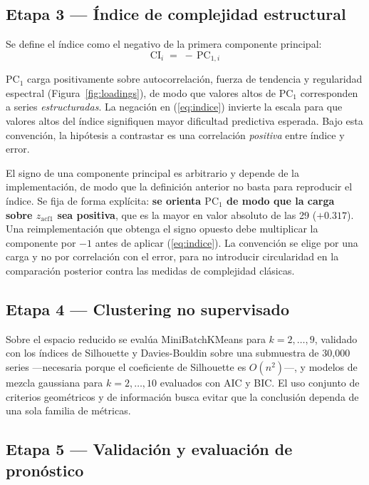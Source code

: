 \subsection{Etapa 3 --- Índice de complejidad estructural}

Se define el índice como el negativo de la primera componente principal:
\begin{equation}
\mathrm{CI}_i \;=\; -\,\mathrm{PC}_{1,i}
\label{eq:indice}
\end{equation}

$\mathrm{PC}_1$ carga positivamente sobre autocorrelación, fuerza de tendencia y
regularidad espectral (Figura~\ref{fig:loadings}), de modo que valores altos de
$\mathrm{PC}_1$ corresponden a series \emph{estructuradas}. La negación en
(\ref{eq:indice}) invierte la escala para que valores altos del índice signifiquen
mayor dificultad predictiva esperada. Bajo esta convención, la hipótesis a
contrastar es una correlación \emph{positiva} entre índice y error.

El signo de una componente principal es arbitrario y depende de la implementación, de
modo que la definición anterior no basta para reproducir el índice. Se fija de forma
explícita: \textbf{se orienta $\mathrm{PC}_1$ de modo que la carga sobre
$z_{\mathrm{acf1}}$ sea positiva}, que es la mayor en valor absoluto de las 29
($+0.317$). Una reimplementación que obtenga el signo opuesto debe multiplicar la
componente por $-1$ antes de aplicar (\ref{eq:indice}). La convención se elige por una
carga y no por correlación con el error, para no introducir circularidad en la
comparación posterior contra las medidas de complejidad clásicas.

\subsection{Etapa 4 --- Clustering no supervisado}

Sobre el espacio reducido se evalúa MiniBatchKMeans para $k=2,\dots,9$, validado
con los índices de Silhouette y Davies-Bouldin sobre una submuestra de 30{,}000
series ---necesaria porque el coeficiente de Silhouette es $O(n^{2})$---, y modelos
de mezcla gaussiana para $k=2,\dots,10$ evaluados con AIC y BIC. El uso conjunto de
criterios geométricos y de información busca evitar que la conclusión dependa de
una sola familia de métricas.

\subsection{Etapa 5 --- Validación y evaluación de pronóstico}

